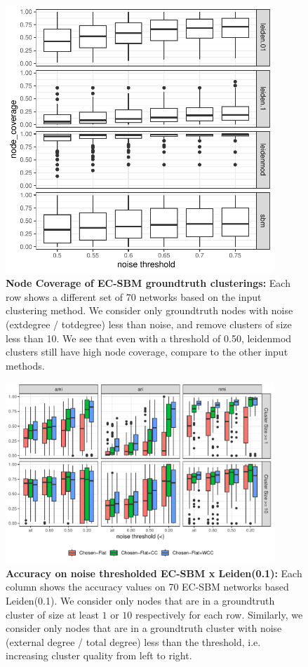 \documentclass[aps,pre,superscriptaddress]{article}
\begin{document}
\begin{figure}[!htpb]
    \centering
    \includegraphics[width=0.9\textwidth]{figures/node_coverage_threshold.pdf}
    \caption[]{\textbf{Node Coverage of EC-SBM groundtruth clusterings:} Each row shows a different set of 70 networks based on the input clustering method. We consider only groundtruth nodes with noise (extdegree / totdegree) less than noise, and remove clusters of size less than 10. We see that even with a threshold of 0.50, leidenmod clusters still have high node coverage, compare to the other input methods. }
\end{figure}

\begin{figure}[!htpb]
    \centering
    \includegraphics[width=0.9\textwidth]{figures/noise_acc_leiden.1.pdf}
    \caption[]{\textbf{Accuracy on noise thresholded EC-SBM x Leiden(0.1):} 
        Each column shows the accuracy values on 70 EC-SBM networks based Leiden(0.1). 
        We consider only nodes that are in a groundtruth cluster of size at least $1$ or $10$ respectively for each row.
        Similarly, we consider only nodes that are in a groundtruth cluster with noise (external degree / total degree) less than the threshold, i.e. increasing cluster quality from left to right. }
\end{figure}
\end{document}
